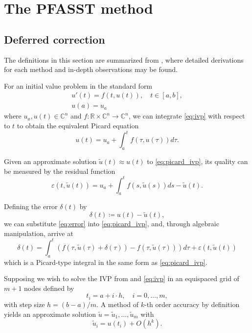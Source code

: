 \chapter{The PFASST method}
\label{chapter:pfasst}

\section{Deferred correction}

The definitions in this section are summarized from \cite{dutt2000spectral}, where detailed derivations for each method and in-depth observations may be found.

For an initial value problem in the standard form
\begin{gather}
    u'(t)=f(t,u(t)),\quad t\in[a,b], \label{eq:ivp} \\
    u(a)=u_a \nonumber
\end{gather}
where \(u_a,u(t)\in\mathbb{C}^n\) and \(f \colon \mathbb{R} \times \mathbb{C}^n \to \mathbb{C}^n \), we can integrate \ref{eq:ivp} with respect to \(t\) to obtain the equivalent Picard equation
\begin{equation}
    u(t)=u_a + \int_a^t f(\tau,u(\tau))d\tau.
	\label{eq:picard_ivp}
\end{equation}

Given an approximate solution \(\tilde{u}(t) \approx u(t)\) to \ref{eq:picard_ivp}, its quality can be measured by the residual function
\begin{equation}
    \varepsilon(t,\tilde{u}(t)) = u_a + \int_a^t f(s,\tilde{u}(s))ds - \tilde{u}(t).
	\label{eq:residual}
\end{equation}

Defining the error \(\delta(t)\) by
\begin{equation}
    \delta(t) \coloneqq u(t)-\tilde{u}(t),
	\label{eq:error}
\end{equation}
we can substitute \ref{eq:error} into \ref{eq:picard_ivp}, and, through algebraic manipulation, arrive at
\begin{equation}
    \delta(t) = \int_a^t (
    f(\tau,\tilde{u}(\tau)+\delta(\tau)) 
    - f(\tau,\tilde{u}(\tau))) d\tau
    + \varepsilon(t,\tilde{u}(t))
    \label{eq:dcmethod_ivp}
\end{equation}
which is a Picard-type integral in the same form as \ref{eq:picard_ivp}.

Supposing we wish to solve the IVP from and \ref{eq:ivp} in an equispaced grid of \( m+1 \) nodes defined by
\begin{equation}
    t_i = a + i \cdot h, \quad i = 0,\ldots,m,
\end{equation}
with step size \( h=(b-a)/m \). A method of \(k\)-th order accuracy by definition yields an approximate solution \( \tilde{u} = \tilde{u}_1, \ldots, \tilde{u}_m \) with
\begin{equation}
    \tilde{u}_i = u(t_i)+O(h^k).
    \label{eq:approx_sol_accuracy}
\end{equation}

